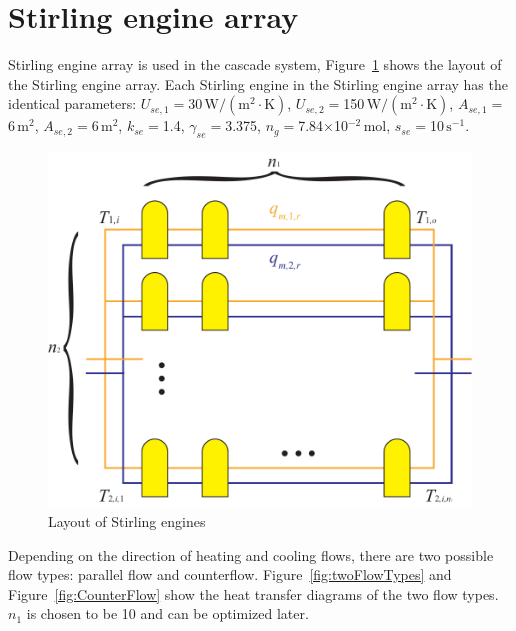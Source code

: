 
\section{Stirling engine array}
Stirling engine array is used in the cascade system, Figure~\ref{fig:Layout of Stirling engines} shows the layout of the Stirling engine array. Each Stirling engine in the Stirling engine array has the identical parameters: $U_{se,1}=$30$\,\mathrm{W/(m^2\cdot{}K)}$, $U_{se,2}=$150$\,\mathrm{W/(m^2\cdot{}K)}$, $A_{se,1}=$6$\,\mathrm{m^2}$, $A_{se,2}=$6$\,\mathrm{m^2}$, $k_{se}=$1.4, $\gamma_{se}=$3.375, $n_g=$7.84$\times$10$^{-2}\,\mathrm{mol}$, $s_{se}=$10$\,\mathrm{s^{-1}}$.

\noindent \begin{figure}[htbp]
\begin{center}
	\includegraphics[width = 0.6\columnwidth]{fig/stirlingEngineArray.pdf}
	\caption{Layout of Stirling engines}
	\label{fig:Layout of Stirling engines}
\end{center}
\end{figure}

Depending on the direction of heating and cooling flows, there are two possible flow types: parallel flow and counterflow. 
Figure~\ref{fig:twoFlowTypes} and 
Figure~\ref{fig:CounterFlow} show the heat transfer diagrams of the two flow types.
 $n_1$ is chosen to be 10 and can be optimized later.

